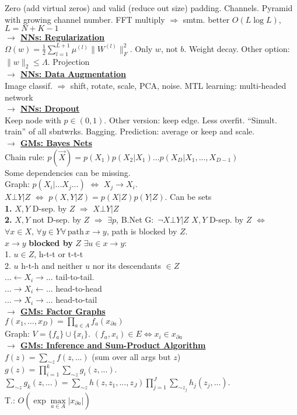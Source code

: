 \documentclass[12pt]{article}
\newcommand{\mytitle}[1]{ {\bf $\rightarrow$ \underline{#1}}\\}
\begin{document}
\begin{multicols*}{2}
Zero (add virtual zeros) and valid (reduce out size) padding.
Channels. Pyramid with growing channel number.
FFT multiply $\Rightarrow$ smtm. better $O(L\log L)$, $L=N+K-1$\\
\mytitle{NNs: Regularization}
$\Omega(w)=\frac{1}{2}\sum\limits_{l=1}^{L+1}\mu^{(l)}\|W^{(l)}\|_F^2$.
Only $w$, not $b$. Weight decay.
Other option: $\|w\|_2\leqslant \Lambda$. Projection\\
\mytitle{NNs: Data Augmentation}
Image classif. $\Rightarrow$ shift, rotate, scale, PCA, noise.
MTL learning: multi-headed network\\
\mytitle{NNs: Dropout}
Keep node with $p\in(0,1)$. Other version: keep edge.
Less overfit. ``Simult. train'' of all sbntwrks. Bagging.
Prediction: average or keep and scale.\\
\mytitle{GMs: Bayes Nets}
Chain rule: $p(\vec{X})=p(X_1)p(X_2|X_1)...p(X_D|X_1,...,X_{D-1})$\\
Some dependencies can be missing.\\
Graph: $p(X_i|...X_j...)$ $\Leftrightarrow$ $X_j\to X_i$.\\
$X\bot Y|Z$ $\Leftrightarrow$ $p(X, Y|Z)=p(X|Z)p(Y|Z)$. Can be sets\\
{\bf 1.} $X, Y$ D-sep. by $Z$ $\Rightarrow$ $X\bot Y|Z$\\
{\bf 2.} $X, Y$ not D-sep. by $Z$ $\Rightarrow$ $\exists p$, B.Net G$\colon$ $\neg X\bot Y|Z$
$X,Y$ D-sep. by $Z$ $\Leftrightarrow$ $\forall x\in X,\,\forall y\in Y \forall\, \mbox{path}\, x\to y$, path is blocked by $Z$.\\$x\to y$ {\bf blocked by} $Z$ $\exists u\in x\to y\colon$\\
1. $u\in Z$, h-t-t or t-t-t\\
2. $u$ h-t-h and neither $u$ nor its descendants $\in Z$\\
$...\leftarrow X_i\rightarrow...$ tail-to-tail.\\
$...\rightarrow X_i\leftarrow...$ head-to-head\\
$...\rightarrow X_i\rightarrow...$ head-to-tail\\
\mytitle{GMs: Factor Graphs}
$f(x_1,...,x_D)=\prod\limits_{a\in A}f_a(x_{\partial a})$\\
Graph: $V=\{f_a\}\cup\{x_i\}$. $(f_a,x_i)\in E\Leftrightarrow x_i\in x_{\partial a}$\\
\mytitle{GMs: Inference and Sum-Product Algorithm}
$f(z)=\sum\limits_{\sim z}f(z,...)$ (sum over all args but $z$)\\
$g(z)=\prod\limits_{i=1}^k\sum\limits_{\sim z}g_i(z,...)$.\\
$\sum\limits_{\sim z}g_k(z,...)=\sum\limits_{\sim z}h(z,z_1,...,z_J)\prod\limits_{j=1}^J\sum\limits_{\sim z_j}h_j(z_j,...)$.\\
T.: $O\left(\exp \max\limits_{a\in A}|x_{\partial a}|\right)$
\end{multicols*}
\end{document}
